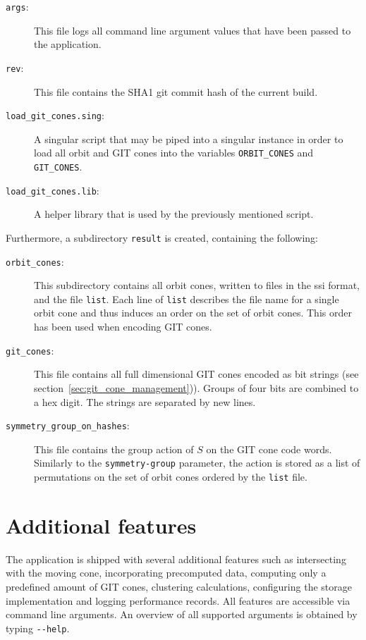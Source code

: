 \begin{description}
	\item[\texttt{args}:] This file logs all command line argument values that have been passed to the application.
	\item[\texttt{rev}:] This file contains the SHA1 git commit hash of the current build.
	\item[\texttt{load\_git\_cones.sing}:] A singular script that may be piped into a singular instance in order to load all orbit and GIT cones into the variables \texttt{ORBIT\_CONES} and \texttt{GIT\_CONES}.
	\item[\texttt{load\_git\_cones.lib}:] A helper library that is used by the previously mentioned script.
\end{description}

Furthermore, a subdirectory \texttt{result} is created, containing the following:

\begin{description}
	\item[\texttt{orbit\_cones}:] This subdirectory contains all orbit cones, written to files in the \ac{ssi} format, and the file \texttt{list}. Each line of \texttt{list} describes the file name for a single orbit cone and thus induces an order on the set of orbit cones. This order has been used when encoding GIT cones.
	\item[\texttt{git\_cones}:] This file contains all full dimensional GIT cones encoded as bit strings (see section~\ref{sec:git_cone_management})). Groups of four bits are combined to a hex digit. The strings are separated by new lines.
	\item[\texttt{symmetry\_group\_on\_hashes}:] This file contains the group action of $S$ on the GIT cone code words. Similarly to the \texttt{symmetry-group} parameter, the action is stored as a list of permutations on the set of orbit cones ordered by the \texttt{list} file.
\end{description}

\section{Additional features}
\label{sec:additional_features}

The application is shipped with several additional features such as intersecting with the moving cone, incorporating precomputed data, computing only a predefined amount of GIT cones, clustering calculations, configuring the storage implementation and logging performance records. All features are accessible via command line arguments. An overview of all supported arguments is obtained by typing \texttt{-{}-help}.

